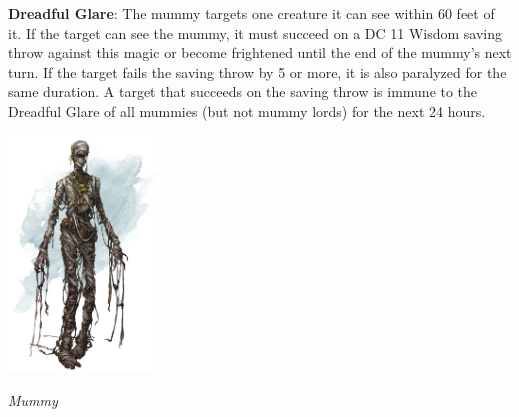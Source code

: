 \noindent\textbf{Dreadful Glare}: The mummy targets one creature it can see within 60 feet of it. If the target can see the mummy, it must succeed on a DC 11 Wisdom saving throw against this magic or become frightened until the end of the mummy's next turn. If the target fails the saving throw by 5 or more, it is also paralyzed for the same duration. A target that succeeds on the saving throw is immune to the Dreadful Glare of all mummies (but not mummy lords) for the next 24 hours.

\begin{center}
	\includegraphics[width = 0.3\textwidth]{mummy}
	
	\emph{Mummy}
\end{center}